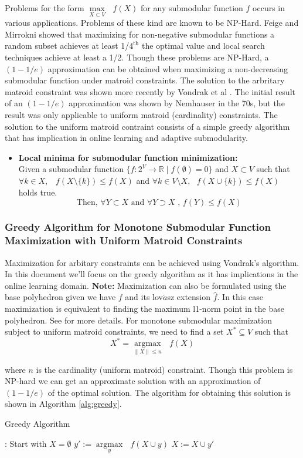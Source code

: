 Problems for the form $\underset{X\subset V}{\operatorname{max }}\text{ } f(X)$ for any submodular function $f$ occurs in various applications. Problems of these kind are known to be NP-Hard. Feige and Mirrokni \cite{Feige07maximizingnon-monotone} showed that maximizing for non-negative submodular functions a random subset achieves at least 1/$4^{\text{th}}$ the optimal value and local search techniques achieve at least a 1/2. Though these problems are NP-Hard, a $(1 - 1/e)$ approximation can be obtained when maximizing a non-decreasing submodular function under matroid constraints.
The solution to the arbritary matroid constraint was shown more recently by Vondrak et al \cite{Vondrak}. The initial result of an $(1 - 1/e)$ approximation was shown by Nemhauser  \cite{Nemhauser} in the 70s, but the result was only applicable to uniform matroid (cardinality) constraints. The solution to the uniform matroid contraint consists of a simple greedy algorithm that has implication in online learning and adaptive submodularity.
\begin{itemize}
 \item {\bf \lemma Local minima for submodular function minimization:} \\ Given a submodular function $\{f:2^V \rightarrow \mathds{R} \mid f(\emptyset) = 0\}$ and  $X \subset V$ such that $\forall k \in X$, $\text{ }f(X\setminus \{k\}) \leq f(X)$  and $\forall k \in V\setminus X, \text{ } f(X\cup \{k\}) \leq f(X)$ holds true.
 \[ \text{Then, } \forall Y\subset X \text{ and } \forall Y\supset X \text{ , }f(Y) \leq f(X) \] 
\end{itemize}
\subsubsection{Greedy Algorithm for Monotone Submodular Function Maximization with Uniform Matroid Constraints}
Maximization for arbitary constraints can be achieved using Vondrak's algorithm. In this document we'll focus on the greedy algorithm as it has implications in the online learning domain. {\bf Note:} Maximization can also be formulated using the base polyhedron given we have $f$ and its lov$\acute{a}$sz extension $\hat{f}$. In this case maximization is equivalent to finding the maximum l1-norm point in the base polyhedron. See \cite{Bach} for more details.
For monotone submodular maximization subject to uniform matroid constraints, we need to find a set $X^*\subseteq V$ such that
\[
 X^* = \underset{\|X\| \leq n}{\operatorname{argmax }}\text{ }f(X)
\]

where $n$ is the cardinality (uniform matroid) constraint. Though this problem is NP-hard we can get an approximate solution with an approximation of $(1-1/e)$ of the optimal solution.  The algorithm for obtaining this solution is shown in Algorithm \ref{alg:greedy}.
\begin{algorithm}[htb]
\caption{Greedy Algorithm}
\label{alg:greedy}
\begin{algorithmic}[1]
\footnotesize
{}: Start with $X = \emptyset$
  \State $y':= \underset{y}{\operatorname{argmax }}\text{ }f(X\cup {y}) $
  \State $X := X \cup {y'}$
\EndFor
\end{algorithmic}
\end{algorithm}
